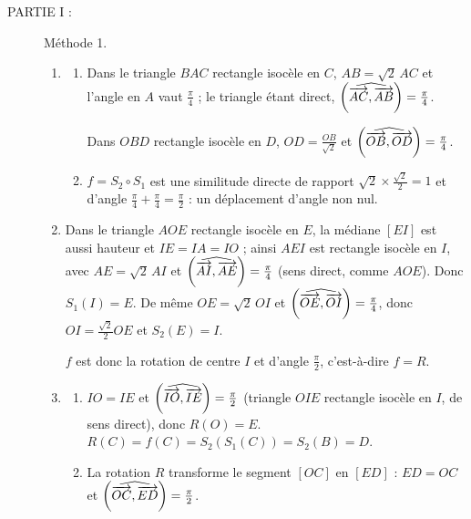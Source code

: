 \begin{description}
	\item[PARTIE I :] Méthode 1.
	\begin{enumerate}
		\item
		\begin{enumerate}
			\item {}
				Dans le triangle $BAC$ rectangle isocèle en $C$, $AB = \sqrt{2}\,AC$ et l'angle en $A$ vaut $\frac{\pi}{4}$ ; le triangle étant direct, $\left( \widehat{ \overrightarrow{AC} , \overrightarrow{AB} } \right) = \frac{\pi}{4}$.
				\par\noindent{}
				Dans $OBD$ rectangle isocèle en $D$, $OD = \frac{OB}{\sqrt{2}}$ et $\left( \widehat{ \overrightarrow{OB} , \overrightarrow{OD} } \right) = \frac{\pi}{4}$.
				\par\noindent{}
			\item {}
				$f = S_2 \circ S_1$ est une similitude directe de rapport $\sqrt{2} \times \frac{\sqrt{2}}{2} = 1$ et d'angle $\frac{\pi}{4} + \frac{\pi}{4} = \frac{\pi}{2}$ :
				un déplacement d'angle non nul.
				\par\noindent{}
		\end{enumerate}
		\item {}
			Dans le triangle $AOE$ rectangle isocèle en $E$, la médiane $[EI]$ est aussi hauteur et $IE = IA = IO$ ; ainsi $AEI$ est rectangle isocèle en $I$,
			avec $AE = \sqrt{2}\,AI$ et $\left( \widehat{ \overrightarrow{AI} , \overrightarrow{AE} } \right) = \frac{\pi}{4}$ (sens direct, comme $AOE$). Donc $S_1(I) = E$.
			De même $OE = \sqrt{2}\,OI$ et $\left( \widehat{ \overrightarrow{OE} , \overrightarrow{OI} } \right) = \frac{\pi}{4}$, donc $OI = \frac{\sqrt{2}}{2}OE$ et $S_2(E) = I$.
			\par\noindent{}
			$f$ est donc la rotation de centre $I$ et d'angle $\frac{\pi}{2}$, c'est-à-dire $f = R$.
		\item
		\begin{enumerate}
			\item {}
				$IO = IE$ et $\left( \widehat{ \overrightarrow{IO} , \overrightarrow{IE} } \right) = \frac{\pi}{2}$ (triangle $OIE$ rectangle isocèle en $I$, de sens direct), donc $R(O) = E$.
				$R(C) = f(C) = S_2(S_1(C)) = S_2(B) = D$.
				\par\noindent{}
			\item {}
				La rotation $R$ transforme le segment $[OC]$ en $[ED]$ : $ED = OC$ et $\left( \widehat{ \overrightarrow{OC} , \overrightarrow{ED} } \right) = \frac{\pi}{2}$.

\end{enumerate}
\end{enumerate}
\end{description}
